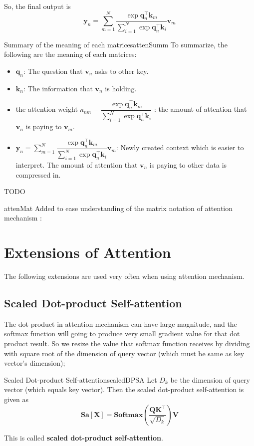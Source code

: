 \documentclass{article}
\begin{document}
            So, the final output is
            \[
                \textbf{y}_n = \sum_{m=1}^{N} \frac{\exp \textbf{q}_n^\top \textbf{k}_m}
                {\sum_{i=1}^{N} \exp{\textbf{q}_n^\top \textbf{k}_i}} \textbf{v}_m
            \]

            \begin{rem}{Summary of the meaning of each matrices}{attenSumm}
                To summarize, the following are the meaning of each matrices:
                \begin{itemize}
                    \item $\textbf{q}_n$: The question that $\textbf{v}_n$ asks to other key.
                    \item $\textbf{k}_n$: The information that $\textbf{v}_n$ is holding.
                    \item the attention weight $a_{nm} = \dfrac{\exp \textbf{q}_n^\top \textbf{k}_m}{\sum_{i=1}^{N} \exp{\textbf{q}_n^\top \textbf{k}_i}}$
                    : the amount of attention that $\textbf{v}_n$ is paying to $\textbf{v}_m$.
                    \item $\textbf{y}_n = \sum_{m=1}^{N} \dfrac{\exp \textbf{q}_n^\top \textbf{k}_m}
                    {\sum_{i=1}^{N} \exp{\textbf{q}_n^\top \textbf{k}_i}} \textbf{v}_m$: Newly created context which is easier to interpret.
                    The amount of attention that $\textbf{v}_n$ is paying to other data is compressed in.
                \end{itemize}
            \end{rem}
            TODO
            \begin{rem}{}{attenMat}
            Added to ease understanding of the matrix notation of attention mechanism :
            \[
            \]
            \end{rem}

\section{Extensions of Attention}
    The following extensions are used very often when using attention mechanism.
    \subsection{Scaled Dot-product Self-attention}
        The dot product in attention mechanism can have large magnitude, and the softmax function will going to produce
        very small gradient value for that dot product result. So we resize the value that softmax function receives by
        dividing with square root of the dimension of query vector (which must be same as key vector's dimension);
        \begin{defn}{Scaled Dot-product Self-attention}{scaledDPSA}
            Let $D_k$ be the dimension of query vector (which equals key vector). Then the scaled dot-product self-attention is given as
            \[
            \textbf{Sa}[\textbf{X}]=\textbf{Softmax}\left(\frac{\textbf{Q}\textbf{K}^{\top}}{\sqrt{D_k}}\right)\textbf{V}
            \]
        \end{defn}
        This is called \textbf{scaled dot-product self-attention}.
        
\end{document}
